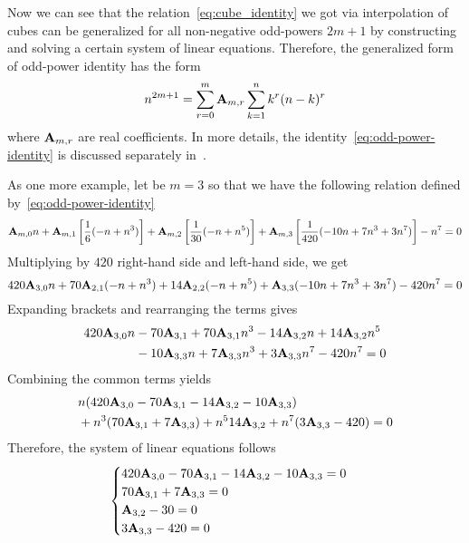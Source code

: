 Now we can see that the relation~\eqref{eq:cube_identity}
we got via interpolation of cubes
can be generalized for all non-negative odd-powers $2m+1$ by constructing
and solving a certain system of linear equations.
Therefore, the generalized form of odd-power identity has the form
\begin{equation}
    n^{2m+1} = \sum_{r=0}^{m} {\mathbf{A}} \sb{m,r} \sum_{k=1}^{n} k^{r} (n-k)^{r}\label{eq:odd-power-identity}
\end{equation}
where ${\mathbf{A}} \sb{m,r}$ are real coefficients.
In more details, the identity~\eqref{eq:odd-power-identity} is discussed
separately in~\cite{kolosov2022106, kolosov2023polynomial}.

As one more example, let be $m=3$ so that we have the following relation defined by~\eqref{eq:odd-power-identity}
\begin{equation*}
    {\mathbf{A}} \sb{m,0} n
    + {\mathbf{A}} \sb{m,1} \left[ \frac{1}{6} (-n + n^3) \right]
    + {\mathbf{A}} \sb{m,2} \left[ \frac{1}{30} (-n + n^5) \right]
    + {\mathbf{A}} \sb{m,3} \left[ \frac{1}{420} (-10 n + 7 n^3 + 3 n^7) \right] - n^7 = 0
\end{equation*}
Multiplying by $420$ right-hand side and left-hand side, we get
\begin{equation*}
    420 {\mathbf{A}} \sb{3,0} n + 70 {\mathbf{A}} \sb{2,1} (-n + n^3) + 14 {\mathbf{A}} \sb{2,2} (-n + n^5) + {\mathbf{A}} \sb{3,3} (-10 n + 7 n^3 + 3 n^7) - 420n^7 = 0
\end{equation*}
Expanding brackets and rearranging the terms gives
\begin{equation*}
    \begin{split}
        420 {\mathbf{A}} \sb{3,0} n
        &- 70 {\mathbf{A}} \sb{3,1} + 70 {\mathbf{A}} \sb{3,1} n^3 - 14 {\mathbf{A}} \sb{3,2} n + 14 {\mathbf{A}} \sb{3,2} n^5 \\
        &- 10 {\mathbf{A}} \sb{3,3} n + 7 {\mathbf{A}} \sb{3,3} n^3 + 3 {\mathbf{A}} \sb{3,3} n^7 - 420n^7 = 0
    \end{split}
\end{equation*}
Combining the common terms yields
\begin{equation*}
    \begin{split}
        &n (420 {\mathbf{A}} \sb{3,0} - 70 {\mathbf{A}} \sb{3,1} - 14 {\mathbf{A}} \sb{3,2} - 10 {\mathbf{A}} \sb{3,3}) \\
        &+ n^3 (70 {\mathbf{A}} \sb{3,1} + 7 {\mathbf{A}} \sb{3,3})
        + n^5 14 {\mathbf{A}} \sb{3,2}
        + n^7 (3 {\mathbf{A}} \sb{3,3} - 420)
        = 0
    \end{split}
\end{equation*}
Therefore, the system of linear equations follows
\begin{equation*}
    \begin{cases}
        420 {\mathbf{A}} \sb{3,0} - 70 {\mathbf{A}} \sb{3,1} - 14 {\mathbf{A}} \sb{3,2} - 10 {\mathbf{A}} \sb{3,3} = 0 \\
        70 {\mathbf{A}} \sb{3,1} + 7 {\mathbf{A}} \sb{3,3} = 0 \\
        {\mathbf{A}} \sb{3,2} - 30 = 0 \\
        3 {\mathbf{A}} \sb{3,3} - 420 = 0
    \end{cases}
\end{equation*}
